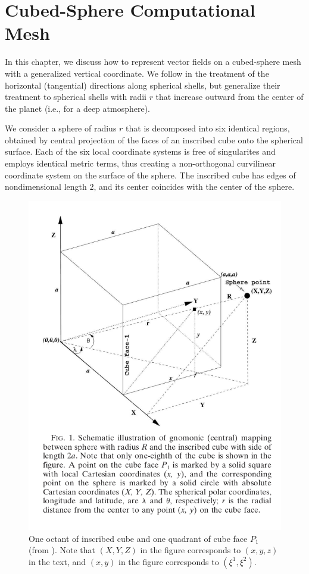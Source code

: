 \documentclass{report}
\begin{document}

\chapter{Cubed-Sphere Computational Mesh}\label{ch:comp_mesh}

In this chapter, we discuss how to represent vector fields on a cubed-sphere mesh with a generalized vertical coordinate. We follow \cite{Nair2005} in the treatment of the horizontal (tangential) directions along spherical shells, but generalize their treatment to spherical shells with radii $r$ that increase outward from the center of the planet (i.e., for a deep atmosphere).

We consider a sphere of radius $r$ that is decomposed into six identical regions, obtained by central projection of the faces of an inscribed cube onto the spherical surface. Each of the six local coordinate systems is free of singularites and employs identical metric terms, thus creating a non-orthogonal curvilinear coordinate system on the surface of the sphere. The inscribed cube has edges of nondimensional length $2$, and its center coincides with the center of the sphere. 
\begin{figure}
    \centering
    \includegraphics[scale=0.4,trim=0cm 9cm 0cm 0cm, clip]{CLIMA-atmos/figures/numerics/NairFig1.png}
    \caption{One octant of inscribed cube and one quadrant of cube face $P_1$ (from \cite{Nair2005}). Note that $(X,Y,Z)$ in the figure corresponds to $(x,y,z)$ in the text, and $(x,y)$ in the figure corresponds to $(\xi^1,\xi^2)$.}
    \label{fig:NairFig1}
\end{figure}
\end{document}
